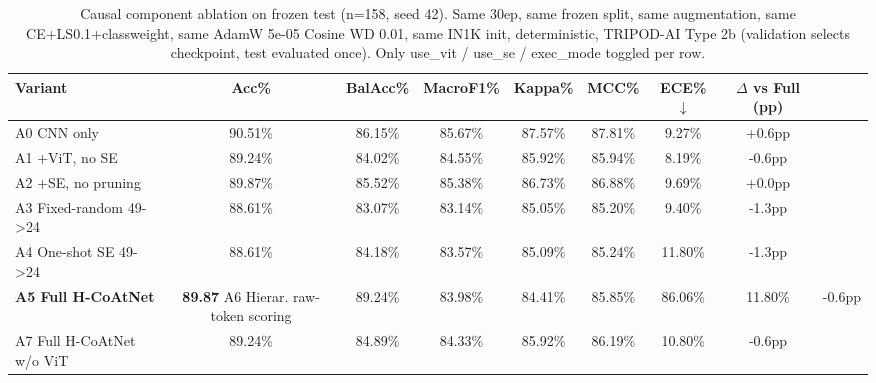\begin{table}[t]
\caption{Causal component ablation on frozen test (n=158, seed 42). Same 30ep, same frozen split, same augmentation, same CE+LS0.1+classweight, same AdamW 5e-05 Cosine WD 0.01, same IN1K init, deterministic, TRIPOD-AI Type 2b (validation selects checkpoint, test evaluated once). Only use\_vit / use\_se / exec\_mode toggled per row.}
\label{tab:ablation}
\centering\small\begin{tabular}{lccccccc}
\toprule Variant & Acc\% & BalAcc\% & MacroF1\% & Kappa\% & MCC\% & ECE\% $\downarrow$ & $\Delta$ vs Full (pp) \\
\midrule
A0 CNN only & 90.51\% & 86.15\% & 85.67\% & 87.57\% & 87.81\% & 9.27\% & +0.6pp \\
A1 +ViT, no SE & 89.24\% & 84.02\% & 84.55\% & 85.92\% & 85.94\% & 8.19\% & -0.6pp \\
A2 +SE, no pruning & 89.87\% & 85.52\% & 85.38\% & 86.73\% & 86.88\% & 9.69\% & +0.0pp \\
A3 Fixed-random 49->24 & 88.61\% & 83.07\% & 83.14\% & 85.05\% & 85.20\% & 9.40\% & -1.3pp \\
A4 One-shot SE 49->24 & 88.61\% & 84.18\% & 83.57\% & 85.09\% & 85.24\% & 11.80\% & -1.3pp \\
\textbf{A5 Full H-CoAtNet} & \textbf{89.87}%
A6 Hierar. raw-token scoring & 89.24\% & 83.98\% & 84.41\% & 85.85\% & 86.06\% & 11.80\% & -0.6pp \\
A7 Full H-CoAtNet w/o ViT & 89.24\% & 84.89\% & 84.33\% & 85.92\% & 86.19\% & 10.80\% & -0.6pp \\
\bottomrule\end{tabular}\end{table}